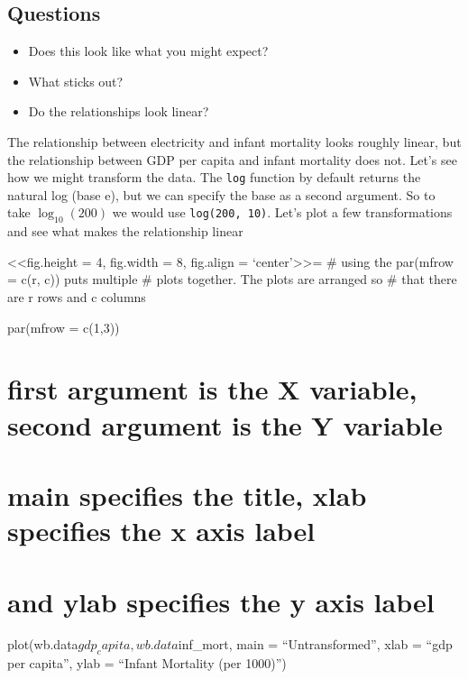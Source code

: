 \documentclass[
]{article}
\begin{document}
\subsection*{Questions}
\begin{itemize}
\item Does this look like what you might expect?
\item What sticks out?
\item Do the relationships look linear?
\end{itemize}

The relationship between electricity and infant mortality looks roughly
linear, but the relationship between GDP per capita and infant mortality
does not. Let's see how we might transform the data. The \texttt{log}
function by default returns the natural log (base e), but we can specify
the base as a second argument. So to take \(\log_10(200)\) we would use
\texttt{log(200, 10)}. Let's plot a few transformations and see what
makes the relationship linear

\textless\textless fig.height = 4, fig.width = 8, fig.align =
`center'\textgreater\textgreater= \# using the par(mfrow = c(r, c)) puts
multiple \# plots together. The plots are arranged so \# that there are
r rows and c columns

par(mfrow = c(1,3))

\hypertarget{first-argument-is-the-x-variable-second-argument-is-the-y-variable}{%
\section{first argument is the X variable, second argument is the Y
variable}\label{first-argument-is-the-x-variable-second-argument-is-the-y-variable}}

\hypertarget{main-specifies-the-title-xlab-specifies-the-x-axis-label}{%
\section{main specifies the title, xlab specifies the x axis
label}\label{main-specifies-the-title-xlab-specifies-the-x-axis-label}}

\hypertarget{and-ylab-specifies-the-y-axis-label}{%
\section{and ylab specifies the y axis
label}\label{and-ylab-specifies-the-y-axis-label}}

plot(wb.data\(gdp_capita, wb.data\)inf\_mort, main = ``Untransformed'',
xlab = ``gdp per capita'', ylab = ``Infant Mortality (per 1000)'')
\end{document}
